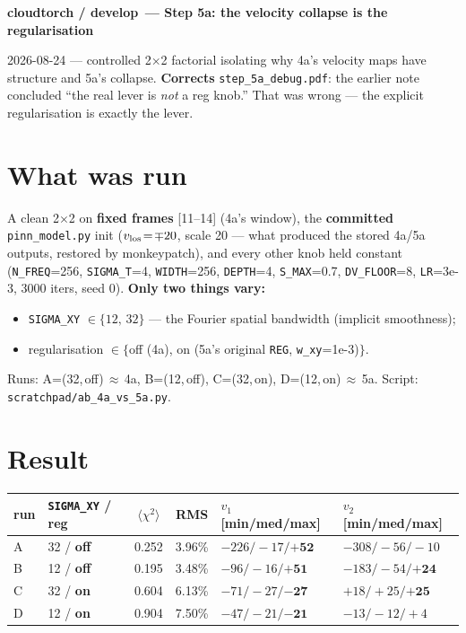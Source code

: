 \documentclass[10pt,a4paper]{article}
\newcommand{\co}[1]{{\small\texttt{#1}}}
\begin{document}
\small

{\sffamily\bfseries\large\color{acc} cloudtorch / develop\, --- Step 5a: the velocity collapse is the regularisation}

\vspace{1pt}
{\sffamily\color{gry}\footnotesize 2026-08-24 --- controlled 2$\times$2 factorial isolating why 4a's velocity maps have structure and 5a's collapse. \textbf{Corrects} \co{step\_5a\_debug.pdf}: the earlier note concluded ``the real lever is \emph{not} a reg knob.'' That was wrong --- the explicit regularisation is exactly the lever.}

\vspace{1pt}{\footnotesize\color{gry}\rule{\textwidth}{0.4pt}}

\section{What was run}

A clean 2$\times$2 on \textbf{fixed frames} [11--14] (4a's window), the \textbf{committed} \co{pinn\_model.py} init ($v_{\rm los}\!=\!\mp20$, scale 20 --- what produced the stored 4a/5a outputs, restored by monkeypatch), and every other knob held constant (\co{N\_FREQ}=256, \co{SIGMA\_T}=4, \co{WIDTH}=256, \co{DEPTH}=4, \co{S\_MAX}=0.7, \co{DV\_FLOOR}=8, \co{LR}=3e-3, 3000 iters, seed 0). \textbf{Only two things vary:}
\begin{itemize}
\item \co{SIGMA\_XY} $\in\{12,\,32\}$ --- the Fourier spatial bandwidth (implicit smoothness);
\item regularisation $\in\{$off (4a), on (5a's original \co{REG}, \co{w\_xy}=1e-3)$\}$.
\end{itemize}
Runs: A=(32,\,off)\,$\approx$\,4a, B=(12,\,off), C=(32,\,on), D=(12,\,on)\,$\approx$\,5a. Script: \co{scratchpad/ab\_4a\_vs\_5a.py}.

\section{Result}

\begin{center}\small
\begin{tabular}{llccl l}
\hline
run & \co{SIGMA\_XY} / reg & $\langle\chi^2\rangle$ & RMS & $v_{1}$ [min/med/max] & $v_{2}$ [min/med/max]\\
\hline
A & 32 / \textbf{off} & 0.252 & 3.96\% & $-226/{-}17/\mathbf{+52}$ & $-308/{-}56/{-}10$\\
B & 12 / \textbf{off} & 0.195 & 3.48\% & $-96/{-}16/\mathbf{+51}$  & $-183/{-}54/\mathbf{+24}$\\
C & 32 / \textbf{on}  & 0.604 & 6.13\% & $-71/{-}27/\mathbf{-27}$  & $+18/{+}25/\mathbf{+25}$\\
D & 12 / \textbf{on}  & 0.904 & 7.50\% & $-47/{-}21/\mathbf{-21}$  & $-13/{-}12/{+}4$\\
\hline
\end{tabular}
\end{center}
\end{document}
